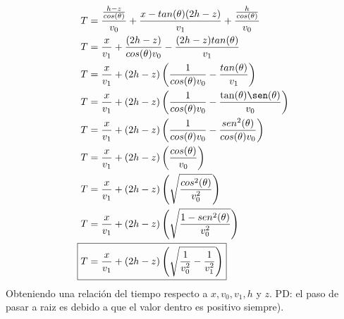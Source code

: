 \documentclass{article}
\theoremstyle{mytheoremstyle}
\theoremstyle{mytheoremstyle}
\theoremstyle{myproblemstyle}
\begin{document}
\begin{align*}
	T&=\frac{\frac{h-z}{cos(\theta )}}{v_0}+\frac{x-tan(\theta )(2h -z)}{v_1}+\frac{\frac{h}{cos(\theta )}}{v_0} \\
	T&=\frac{x}{v_1}+ \frac{(2h-z)}{cos(\theta)v_0}-\frac{(2h-z)tan(\theta)}{v_1} \\ 
	T&=\frac{x}{v_1}+(2h-z)\left(\frac{1}{cos(\theta )v_0}-\frac{tan(\theta )}{v_1}\right) \\ 
	T&=\frac{x}{v_1}+(2h-z)\left(\frac{1}{cos(\theta )v_0}-\frac{\tan(\theta)\sen(\theta)}{v_0}\right) \\ 
	T&=\frac{x}{v_1}+(2h-z)\left(\frac{1}{cos(\theta )v_0}-\frac{sen^2(\theta )}{cos(\theta )v_0}\right) \\ 
	T&=\frac{x}{v_1}+(2h-z)\left(\frac{cos(\theta )}{v_0}\right) \\ 
	T&=\frac{x}{v_1}+(2h-z)\left(\sqrt{\frac{cos^2(\theta )}{v_0^2}}\right) \\
	T&=\frac{x}{v_1}+(2h-z)\left(\sqrt{\frac{1-sen^2(\theta )}{v_0^2}}\right) \\
	\Aboxed{T&=\frac{x}{v_1}+(2h-z)\left(\sqrt{\frac{1}{v_0^2}-\frac{1}{v_1^2}}\right)}
\end{align*}
Obteniendo una relación del tiempo respecto a $x, v_0,v_1,h$ y $z$. PD: el paso de pasar a raiz es debido a que el valor dentro es positivo siempre).
\end{document}
